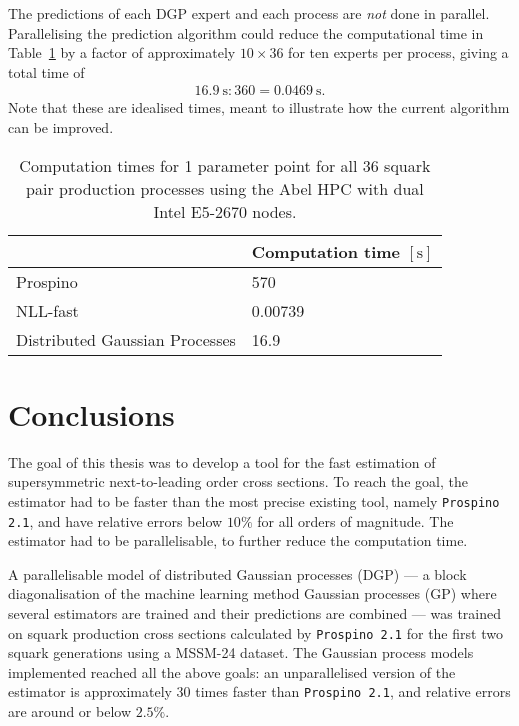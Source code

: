 \documentclass[twoside,english]{uiofysmaster}
\begin{document}
{{The predictions of each DGP expert and each process are \textit{not} done in parallel. Parallelising the prediction algorithm could reduce the computational time in Table~\ref{Tab :: results : Computation times} by a factor of approximately $10 \times 36$ for ten experts per process, giving a total time of
\begin{align*}
16.9~\mathrm{s} : 360 = 0.0469~\mathrm{s}.
\end{align*}
Note that these are idealised times, meant to illustrate how the current algorithm can be improved. 

\begin{table}
\centering
\begin{tabular}{@{}ll@{}} \toprule
 & Computation time $[\mathrm{s}]$\\ \midrule
Prospino & 570 \\
NLL-fast & 0.00739\\
Distributed Gaussian Processes & 16.9\\
\bottomrule
\end{tabular}
\caption{Computation times for 1 parameter point for all 36 squark pair production processes using the Abel HPC with dual Intel E5-2670 nodes.}
\label{Tab :: results : Computation times}
\end{table}








\chapter*{Conclusions}

The goal of this thesis was to develop a tool for the fast estimation of supersymmetric next-to-leading order cross sections. To reach the goal, the estimator had to be faster than the most precise existing tool, namely \verb|Prospino 2.1|, and have relative errors below $10 \%$ for all orders of magnitude. The estimator had to be parallelisable, to further reduce the computation time. 

A parallelisable model of distributed Gaussian processes (DGP) --- a block diagonalisation of the machine learning method Gaussian processes (GP) where several estimators are trained and their predictions are combined --- was trained on squark production cross sections calculated by \verb|Prospino 2.1| for the first two squark generations using a MSSM-24 dataset. The Gaussian process models implemented reached all the above goals: an unparallelised version of the estimator is approximately 30 times faster than \verb|Prospino 2.1|, and relative errors are around or below $2.5 \%$.  

}}
\end{document}
